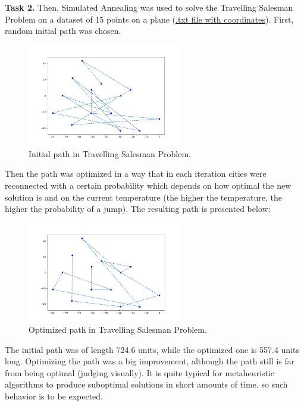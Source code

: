 \documentclass[12pt, a4paper]{article}
\begin{document}
\newpage

\textbf{Task 2.} Then, Simulated Annealing was used to solve the Travelling Salesman Problem on a dataset of 15 points on a plane (\href{https://github.com/Dormant512/itmo_lab_listings/blob/main/coords.txt}{.txt file with coordinates}). First, random initial path was chosen.

\vspace{-3mm}
\begin{figure}[!h]
\centering
\includegraphics[width=0.6\textwidth]{pic2.png}
\caption{Initial path in Travelling Salesman Problem.}
\end{figure}

Then the path was optimized in a way that in each iteration cities were reconnected with a certain probability which depends on how optimal the new solution is and on the current temperature (the higher the temperature, the higher the probability of a jump). The resulting path is presented below:

\begin{figure}[!h]
\centering
\includegraphics[width=0.6\textwidth]{pic3.png}
\caption{Optimized path in Travelling Salesman Problem.}
\end{figure}

The initial path was of length 724.6 units, while the optimized one is 557.4 units long. Optimizing the path was a big improvement, although the path still is far from being optimal (judging visually). It is quite typical for metaheuristic algorithms to produce suboptimal solutions in short amounts of time, so such behavior is to be expected.
\end{document}
